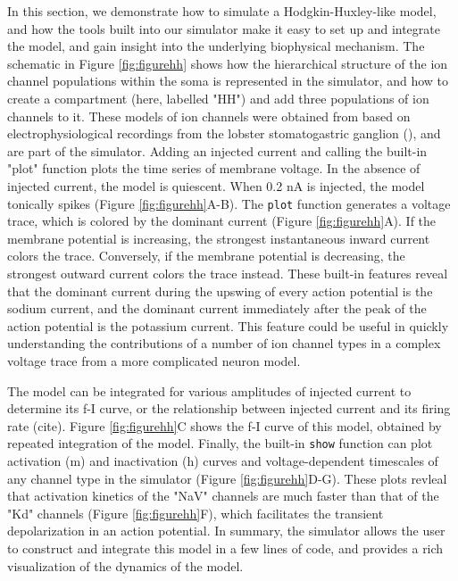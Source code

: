 \documentclass{frontiersSCNS} %
\begin{document}
In this section, we demonstrate how to simulate a Hodgkin-Huxley-like model, and how the tools built into our simulator make it easy to set up and integrate the model, and gain insight into the underlying biophysical mechanism. The schematic in Figure \ref{fig:figurehh} shows how the hierarchical structure of the ion channel populations within the soma is represented in the simulator, and how to create a compartment (here, labelled "HH") and add three populations of ion channels to it. These models of ion channels were obtained from \cite{liuModelNeuronActivitydependent1998} based on electrophysiological recordings from the lobster stomatogastric ganglion (\cite{turrigianoSelectiveRegulationCurrent1995}), and are part of the simulator. Adding an injected current and calling the built-in "plot" function plots the time series of membrane voltage. In the absence of injected current, the model is quiescent. When 0.2 nA is injected, the model tonically spikes (Figure \ref{fig:figurehh}A-B).  The \texttt{plot} function generates a voltage trace, which is colored by the dominant current (Figure \ref{fig:figurehh}A). If the membrane potential is increasing, the strongest instantaneous inward current colors the trace. Conversely, if the membrane potential is decreasing, the strongest outward current colors the trace instead. These built-in features reveal that the dominant current during the upswing of every action potential is the sodium current, and the dominant current immediately after the peak of the action potential is the potassium current. This feature could be useful in quickly understanding the contributions of a number of ion channel types in a complex voltage trace from a more complicated neuron model. 

The model can be integrated for various amplitudes of injected current to determine its f-I curve, or the relationship between injected current and its firing rate (cite). Figure \ref{fig:figurehh}C shows the f-I curve of this model, obtained by repeated integration of the model.  Finally, the built-in \texttt{show} function can plot activation (m) and inactivation (h) curves and voltage-dependent timescales of any channel type in the simulator (Figure \ref{fig:figurehh}D-G). These plots revleal that activation kinetics of the "NaV" channels are much faster than that of the "Kd" channels (Figure \ref{fig:figurehh}F), which facilitates the transient depolarization in an action potential. In summary, the simulator allows the user to construct and integrate this model in a few lines of code, and provides a rich visualization of the dynamics of the model. 
\end{document}
